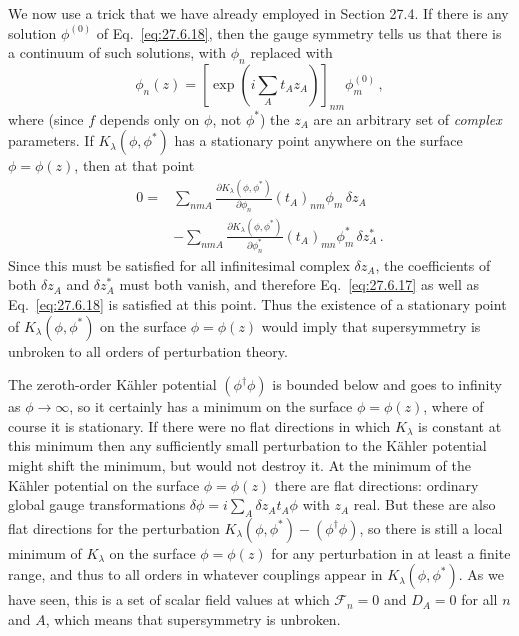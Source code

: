We now use a trick that we have already employed in Section 27.4. If there is
any solution \(\phi^{(0)}\) of Eq.~\eqref{eq:27.6.18}, then the gauge
symmetry tells us that there is a continuum of such solutions, with
\(\phi_n\) replaced with
\begin{equation}
  \phi_n(z)
  =
  \left[
    \exp\left(i\sum_A t_Az_A\right)
  \right]_{nm}
  \phi_m^{(0)}\,,
  \tag{27.6.20}\label{eq:27.6.20}
\end{equation}
where (since \(f\) depends only on \(\phi\), not \(\phi^*\)) the \(z_A\)
are an arbitrary set of \emph{complex} parameters. If
\(K_\lambda(\phi,\phi^*)\) has a stationary point anywhere on the surface
\(\phi=\phi(z)\), then at that point
\begin{equation}
  \begin{aligned}
  0={}&
  \sum_{nmA}
  \frac{\partial K_\lambda(\phi,\phi^*)}{\partial\phi_n}
  (t_A)_{nm}\phi_m\,\delta z_A
  \\
  &-
  \sum_{nmA}
  \frac{\partial K_\lambda(\phi,\phi^*)}{\partial\phi_n^*}
  (t_A)_{mn}\phi_m^*\,\delta z_A^*\,.
  \end{aligned}
  \tag{27.6.21}\label{eq:27.6.21}
\end{equation}
Since this must be satisfied for all infinitesimal complex \(\delta z_A\),
the coefficients of both \(\delta z_A\) and \(\delta z_A^*\) must both
vanish, and therefore Eq.~\eqref{eq:27.6.17} as well as
Eq.~\eqref{eq:27.6.18} is satisfied at this point. Thus the existence of a
stationary point of \(K_\lambda(\phi,\phi^*)\) on the surface
\(\phi=\phi(z)\) would imply that supersymmetry is unbroken to all orders of
perturbation theory.

The zeroth-order K\"ahler potential \((\phi^\dagger\phi)\) is bounded below
and goes to infinity as \(\phi\longrightarrow\infty\), so it certainly has a
minimum on the surface \(\phi=\phi(z)\), where of course it is stationary.
If there were no flat directions in which \(K_\lambda\) is constant at this
minimum then any sufficiently small perturbation to the K\"ahler potential
might shift the minimum, but would not destroy it. At the minimum of the
K\"ahler potential on the surface \(\phi=\phi(z)\) there are flat
directions: ordinary global gauge transformations
\(\delta\phi=i\sum_A\delta z_A t_A\phi\) with \(z_A\) real. But these are
also flat directions for the perturbation
\(K_\lambda(\phi,\phi^*)-(\phi^\dagger\phi)\), so there is still a local
minimum of \(K_\lambda\) on the surface \(\phi=\phi(z)\) for any
perturbation in at least a finite range, and thus to all orders in whatever
couplings appear in \(K_\lambda(\phi,\phi^*)\). As we have seen, this is a
set of scalar field values at which \(\mathcal{F}_n=0\) and \(D_A=0\) for
all \(n\) and \(A\), which means that supersymmetry is unbroken.

